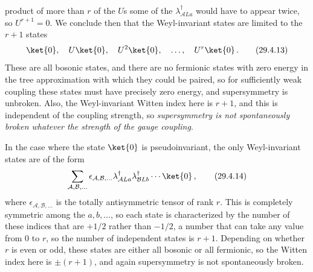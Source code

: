 product of more than \(r\) of the \(U\)s some of the
\(\lambda_{\mathcal A La}^\dagger\) would have to appear twice, so
\(U^{r+1}=0\). We conclude then that the Weyl-invariant states are limited
to the \(r+1\) states
\begin{equation}
  \ket{0},\quad U\ket{0},\quad U^2\ket{0},\quad\ldots,\quad U^r\ket{0}\,.
  \tag{29.4.13}\label{eq:29.4.13}
\end{equation}
These are all bosonic states, and there are no fermionic states with zero
energy in the tree approximation with which they could be paired, so for
sufficiently weak coupling these states must have precisely zero energy,
and supersymmetry is unbroken. Also, the Weyl-invariant Witten index here
is \(r+1\), and this is independent of the coupling strength, so
\emph{supersymmetry is not spontaneously broken whatever the strength of
the gauge coupling}.

In the case where the state \(\ket{0}\) is pseudoinvariant, the only
Weyl-invariant states are of the form
\begin{equation}
  \sum_{\mathcal A,\mathcal B,\ldots}
  \epsilon_{\mathcal A,\mathcal B,\ldots}
  \lambda_{\mathcal A La}^\dagger
  \lambda_{\mathcal B Lb}^\dagger
  \cdots\ket{0}\,,
  \tag{29.4.14}\label{eq:29.4.14}
\end{equation}
where \(\epsilon_{\mathcal A,\mathcal B,\ldots}\) is the totally
antisymmetric tensor of rank \(r\). This is completely symmetric among the
\(a,b,\ldots\), so each state is characterized by the number of these
indices that are \(+1/2\) rather than \(-1/2\), a number that can take any
value from 0 to \(r\), so the number of independent states is \(r+1\).
Depending on whether \(r\) is even or odd, these states are either all
bosonic or all fermionic, so the Witten index here is \(\pm(r+1)\), and
again supersymmetry is not spontaneously broken.

